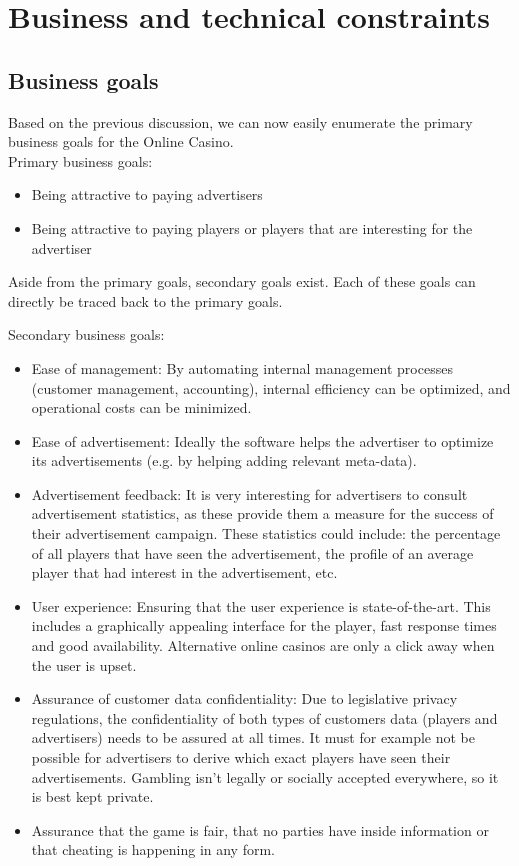 \documentclass[a4paper,11pt]{report}
\begin{document}
\section{Business and technical constraints}

\subsection{Business goals}
Based on the previous discussion, we can now easily enumerate the primary business goals for the Online Casino. \\
 Primary business goals:
\begin{itemize}
\item Being attractive to paying advertisers
\item Being attractive to paying players or players that are interesting for the advertiser
\end{itemize}

Aside from the primary goals, secondary goals exist. Each of these goals can directly be traced back to 
the primary goals.

Secondary business goals:
\begin{itemize}
\item Ease of management: By automating internal management processes (customer management, accounting), internal efficiency can be optimized, and operational costs can be minimized. 
\item Ease  of  advertisement:  Ideally the software helps the advertiser to optimize its advertisements (e.g. by helping adding relevant meta-data).
\item Advertisement   feedback:   It   is   very   interesting   for   advertisers   to   consult   advertisement statistics, as these provide them a measure for the success of their advertisement campaign. These statistics could include: the percentage of all players that have seen the advertisement, the 
  profile of an average player that had interest in the advertisement, etc. 
\item User experience: Ensuring that the user experience is state-of-the-art. This includes a graphically appealing interface for the player, fast response times and good availability. Alternative online casinos are only a click away when the user is upset.

\item Assurance   of   customer   data   confidentiality:   Due   to   legislative   privacy   regulations,   the confidentiality of both types of customers data (players and advertisers) needs to be assured at all times. It must for example not be possible for advertisers to derive which exact players have seen their advertisements. Gambling isn't legally or socially accepted everywhere, so it is best kept private.
\item Assurance that the game is fair, that no parties have inside information or that cheating is happening in any form.
\end{itemize}
\end{document}

